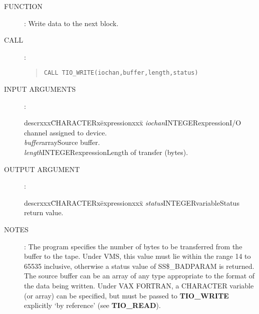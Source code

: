 \begin{description}
\item [FUNCTION]:
Write data to the next block.
\item [CALL]:
\begin{quote}
{\tt CALL TIO\_WRITE(iochan,buffer,length,status)}
\end{quote}
\item [INPUT ARGUMENTS]:
\begin{tabbing}
descrxxx\=CHARACTERx\=expressionxxx\=\kill
{\em iochan}\>INTEGER\>expression\>I/O channel assigned to device.\\
{\em buffer}\>\>array\>Source buffer.\\
{\em length}\>INTEGER\>expression\>Length of transfer (bytes).
\end{tabbing}
\item [OUTPUT ARGUMENT]:
\begin{tabbing}
descrxxx\=CHARACTERx\=expressionxxx\=\kill
{\em status}\>INTEGER\>variable\>Status return value.
\end{tabbing}
\item [NOTES]:
The program specifies the number of bytes to be transferred from the
buffer to the tape.
Under VMS, this value must lie within the range 14 to 65535 inclusive, otherwise
a status value of SS\$\_BADPARAM is returned.
The source buffer can be an array of any type appropriate to the format of the
data being written.
Under VAX FORTRAN, a CHARACTER variable (or array) can be specified, but must be
passed to {\bf TIO\_WRITE} explicitly `by reference' (see {\bf TIO\_READ}).
\end{description}

